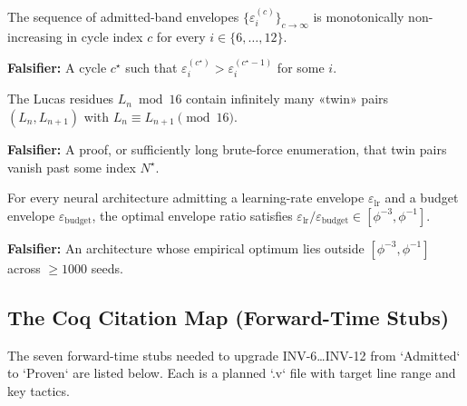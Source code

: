 \begin{conjecture}
\label{conj:31-A}
The sequence of admitted-band envelopes $\{\varepsilon_{i}^{(c)}\}_{c \to \infty}$ is monotonically non-increasing in cycle index $c$ for every $i \in \{6,\dots,12\}$.
\end{conjecture}
\textbf{Falsifier:} A cycle $c^{\star}$ such that $\varepsilon_{i}^{(c^{\star})} > \varepsilon_{i}^{(c^{\star}-1)}$ for some $i$.

\begin{conjecture}
\label{conj:31-B}
The Lucas residues $L_{n} \bmod 16$ contain infinitely many «twin» pairs $(L_{n}, L_{n+1})$ with $L_{n} \equiv L_{n+1} \pmod{16}$.
\end{conjecture}
\textbf{Falsifier:} A proof, or sufficiently long brute-force enumeration, that twin pairs vanish past some index $N^{\star}$.

\begin{conjecture}
\label{conj:31-C}
For every neural architecture admitting a learning-rate envelope $\varepsilon_{\mathrm{lr}}$ and a budget envelope $\varepsilon_{\mathrm{budget}}$, the optimal envelope ratio satisfies $\varepsilon_{\mathrm{lr}} / \varepsilon_{\mathrm{budget}} \in [\phi^{-3}, \phi^{-1}]$.
\end{conjecture}
\textbf{Falsifier:} An architecture whose empirical optimum lies outside $[\phi^{-3}, \phi^{-1}]$ across $\geq 1000$ seeds.

\subsection{The Coq Citation Map (Forward-Time Stubs)}
\label{sec:31-coq-stubs}

The seven forward-time stubs needed to upgrade INV-6…INV-12 from `Admitted` to `Proven` are listed below. Each is a planned `.v` file with target line range and key tactics.

